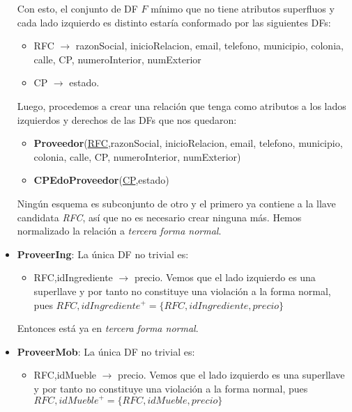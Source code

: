 \documentclass[11pt,letterpaper]{article}
\begin{document}
\begin{itemize}
Con esto, el conjunto de DF $F$ mínimo que no tiene atributos superfluos y cada lado izquierdo es distinto estaría conformado por las siguientes DFs:

\begin{itemize}
\item RFC $\rightarrow$ razonSocial, inicioRelacion, email, telefono,  municipio, colonia, calle, CP, numeroInterior, numExterior
\item CP $\rightarrow$ estado.
\end{itemize} 

Luego, procedemos a crear una relación que tenga como atributos a los lados izquierdos y derechos de las DFs que nos quedaron:

\begin{itemize}
\item {\footnotesize \textbf{Proveedor}(\underline{RFC},razonSocial, inicioRelacion, email, telefono,  municipio, colonia, calle, CP, numeroInterior, numExterior)}
\item {\footnotesize \textbf{CPEdoProveedor}(\underline{CP},estado)}
\end{itemize}

Ningún esquema es subconjunto de otro y el primero ya contiene a la llave candidata \textit{RFC}, así que no es necesario crear ninguna más. Hemos normalizado la relación a \textit{tercera forma normal}.

\item \textbf{ProveerIng}: La única DF no trivial es:

\begin{itemize}
\item RFC,idIngrediente $\rightarrow$ precio. Vemos que el lado izquierdo es una superllave y por tanto no constituye una violación a la forma normal, pues $RFC,idIngrediente^+=\{RFC,idIngrediente,precio\}$
\end{itemize}


Entonces está ya en \textit{tercera forma normal}.

\item \textbf{ProveerMob}: La única DF no trivial es:

\begin{itemize}
\item RFC,idMueble $\rightarrow$ precio. Vemos que el lado izquierdo es una superllave y por tanto no constituye una violación a la forma normal, pues $RFC,idMueble^+=\{RFC,idMueble,precio\}$
\end{itemize}


\end{itemize}
\end{document}
